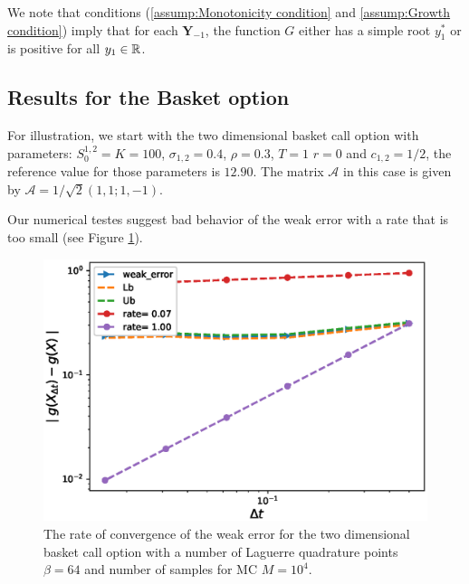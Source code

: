 \begin{remark}
We note that  conditions (\eqref{assump:Monotonicity condition} and \eqref{assump:Growth condition}) imply that for each $\mathbf{Y}_{-1}$, the function $G$ either has a simple  root $y_1^\ast$ or is positive for all $y_1 \in \mathbb{R}$.
\end{remark}

\subsection{Results for the Basket option}
For illustration, we start with the two dimensional basket call option  with parameters:  $S_0^{1,2}=K=100$, $\sigma_{1,2}=0.4$, $\rho=0.3$, $T=1$ $r=0$ and $c_{1,2}=1/2$, the reference value for those parameters  is  $12.90$. The matrix $\mathcal{A}$ in this case is given by $\mathcal{A} = 1/\sqrt{2} (1, 1; 1, -1)$.

Our  numerical testes suggest bad behavior of the weak error with a rate that is  too small (see Figure \ref{fig:Weak_rate_two_dim_basket}). 
\FloatBarrier
\begin{figure}[h!]
		\centering
		\includegraphics[width=0.4\linewidth]{./figures/basket_call_2d_time_stepping/weak_convergence/weak_convergence_order_basket_option_2d_relative_M_10_4_beta_64}

	\caption{The rate of convergence of the weak error for the two dimensional basket call option with  a number of Laguerre  quadrature points  $\beta=64$ and number of samples for MC $M=10^4$.  }
	\label{fig:Weak_rate_two_dim_basket}
\end{figure}
\FloatBarrier

